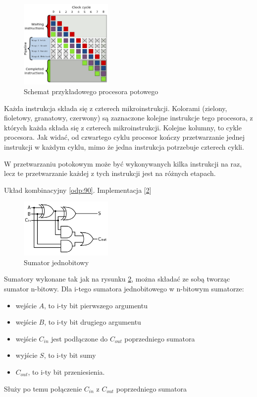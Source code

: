 {\begin{figure}[ht]
	\centering
	\includegraphics[width=0.4\textwidth]{06/img/pipeline}
	\caption{Schemat przykładowego procesora potowego}
	\label{pic:pip}
\end{figure}

Każda instrukcja składa się z czterech mikroinstrukcji. Kolorami (zielony, fioletowy, granatowy, czerwony) są zaznaczone kolejne instrukcje tego procesora, z których każda składa się z czterech mikroinstrukcji. Kolejne kolumny, to cykle procesora. Jak widać, od czwartego cyklu procesor kończy przetwarzanie jednej instrukcji w każdym cyklu, mimo że jedna instrukcja potrzebuje czterech cykli.

}
{W przetwarzaniu potokowym może być wykonywanych kilka instrukcji na raz, lecz te przetwarzanie każdej z tych instrukcji jest na różnych etapach.}

{
Układ kombinacyjny \ref{odp:90}. Implementacja [\ref{pic:sum}]
\begin{figure}
	\centering
	\includegraphics[width=0.4\textwidth]{06/img/sumator}
	\caption{Sumator jednobitowy}
	\label{pic:sum}
\end{figure}

Sumatory wykonane tak jak na rysunku \ref{pic:sum}, można składać ze sobą tworząc sumator n-bitowy.
Dla i-tego sumatora jednobitowego w n-bitowym sumatorze:
\begin{itemize}
	\item wejście $A$, to i-ty bit pierwszego argumentu
	\item wejście $B$, to i-ty bit drugiego argumentu
	\item wejście $C_{in}$ jest podłączone do $C_{out}$ poprzedniego sumatora
	\item wyjście $S$, to i-ty bit sumy
	\item $C_{out}$, to i-ty bit przeniesienia.
\end{itemize}

}
{Służy po temu połączenie $C_{in}$ z $C_{out}$ poprzedniego sumatora}

